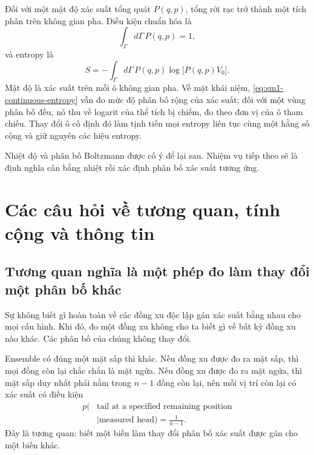 Đối với một mật độ xác suất tổng quát \(P(q,p)\), tổng rời rạc trở thành một tích phân trên không gian pha. Điều kiện chuẩn hóa là
\begin{equation}
 \int_\Gamma d\Gamma\,P(q,p)=1,
 \label{eq:sm1-continuous-normalization}
\end{equation}
và entropy là
\begin{equation}
 S=-\int_\Gamma d\Gamma\,
 P(q,p)\log\!\bigl[P(q,p)V_0\bigr].
 \label{eq:sm1-continuous-entropy}
\end{equation}
Mật độ là xác suất trên mỗi ô không gian pha. Về mặt khái niệm,
\eqref{eq:sm1-continuous-entropy} vẫn đo mức độ phân bố rộng của xác suất; đối với một vùng phân bố đều, nó thu về logarit của thể tích bị chiếm, đo theo đơn vị của ô tham chiếu. Thay đổi ô cố định đó làm tịnh tiến mọi entropy liên tục cùng một hằng số cộng và giữ nguyên các hiệu entropy.

\begin{classroomqa}
\end{classroomqa}

Nhiệt độ và phân bố Boltzmann được cố ý để lại sau. Nhiệm vụ tiếp theo sẽ là định nghĩa cân bằng nhiệt rồi xác định phân bố xác suất tương ứng.

\section{Các câu hỏi về tương quan, tính cộng và thông tin}

\subsection{Tương quan nghĩa là một phép đo làm thay đổi một phân bố khác}

Sự không biết gì hoàn toàn về các đồng xu độc lập gán xác suất bằng nhau cho mọi cấu hình. Khi đó, đo một đồng xu không cho ta biết gì về bất kỳ đồng xu nào khác. Các phân bố của chúng không thay đổi.

Ensemble có đúng một mặt sấp thì khác. Nếu đồng xu được đo ra mặt sấp, thì mọi đồng còn lại chắc chắn là mặt ngửa. Nếu đồng xu được đo ra mặt ngửa, thì mặt sấp duy nhất phải nằm trong \(n-1\) đồng còn lại, nên mỗi vị trí còn lại có xác suất có điều kiện
\begin{equation}
\begin{aligned}
 p(&\text{tail at a specified remaining position}\\
   &\mid\text{measured head})=\frac{1}{n-1}.
\end{aligned}
 \label{eq:sm1-conditional-tail}
\end{equation}
Đây là tương quan: biết một biến làm thay đổi phân bố xác suất được gán cho một biến khác.

